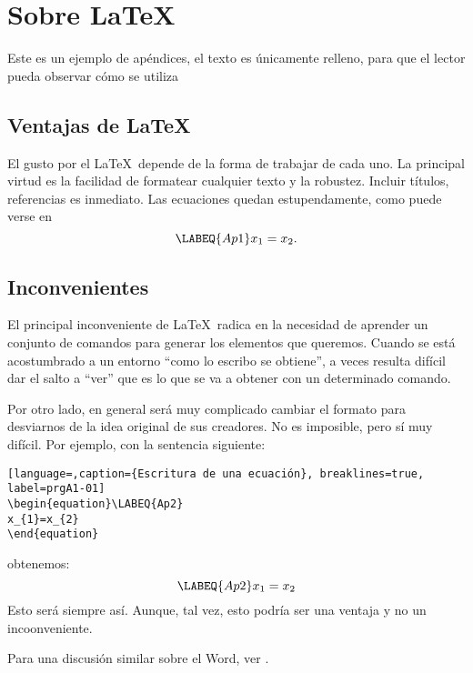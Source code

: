 \chapter{Sobre  \LaTeX}
{Este es un ejemplo de apéndices, el texto es únicamente relleno, para que el lector pueda observar cómo se utiliza}
\section{Ventajas de \LaTeX}

El gusto por el \LaTeX\ depende de la forma de trabajar de cada uno. La principal virtud es la facilidad de formatear cualquier texto y la robustez. Incluir títulos, referencias es inmediato.
Las ecuaciones quedan estupendamente, como puede verse en 
\begin{equation}\LABEQ{Ap1}
x_{1}=x_{2}.
\end{equation}


\section{Inconvenientes}
El principal inconveniente de \LaTeX\ radica en la necesidad de aprender un conjunto de comandos para generar los elementos que queremos. Cuando se está acostumbrado a un entorno ``como lo escribo se obtiene'', a veces resulta difícil dar el salto a ``ver'' que es lo que se va a obtener con un determinado comando. 

Por otro lado, en general será muy complicado cambiar el formato para desviarnos de la idea original de sus creadores. No es imposible, pero sí muy difícil. Por ejemplo, con la sentencia siguiente:
 
\begin{lstlisting}[language=,caption={Escritura de una ecuación}, breaklines=true, label=prgA1-01]
\begin{equation}\LABEQ{Ap2}
x_{1}=x_{2}
\end{equation}
\end{lstlisting}
obtenemos:
\begin{equation}\LABEQ{Ap2}
x_{1}=x_{2}
\end{equation}
Esto será siempre así. Aunque, tal vez, esto podría ser una ventaja y no un incoonveniente.

Para una discusión similar sobre el Word\tsp{\textregistered}, ver .


